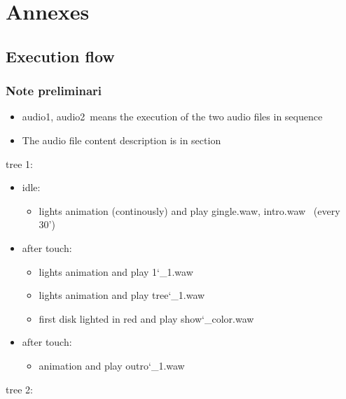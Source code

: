 \documentclass[a4paper,11pt]{report}
\begin{document}




\chapter{Annexes}
\section{Execution flow}
\subsection{Note preliminari}
\begin{itemize}
	\item \lbrack audio1, audio2\rbrack ~means the execution of the two audio files in sequence
	\item The audio file content description is in section \rbrack
\end{itemize}
tree 1:
\begin{itemize}
	\item idle:
	\begin{itemize}
		\item lights animation (continously) and play \lbrack gingle.waw, intro.waw\rbrack~ (every 30')
	\end{itemize}
	\item after touch:
	\begin{itemize}
		\item lights animation and play 1\char`_1.waw 
		\item lights animation and play tree\char`_1.waw
		\item first disk lighted in red and play show\char`_color.waw
	\end{itemize}
	\item after touch:
	\begin{itemize}
		\item animation and play outro\char`_1.waw
	\end{itemize}
\end{itemize}
tree 2:
\end{document}
